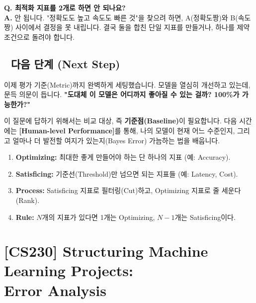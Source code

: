 \documentclass[11pt,a4paper]{book}
\theoremstyle{definition}
\begin{document}
\textbf{Q. 최적화 지표를 2개로 하면 안 되나요?} \\
\textbf{A.} 안 됩니다. "정확도도 높고 속도도 빠른 것"을 찾으려 하면, A(정확도짱)와 B(속도짱) 사이에서 결정을 못 내립니다. 결국 둘을 합친 단일 지표를 만들거나, 하나를 제약 조건으로 돌려야 합니다.

\section*{🔗 다음 단계 (Next Step)}
이제 평가 기준(Metric)까지 완벽하게 세팅했습니다. 모델을 열심히 개선하고 있는데, 문득 의문이 듭니다.
\textbf{"도대체 이 모델은 어디까지 좋아질 수 있는 걸까? 100\%가 가능한가?"}

이 질문에 답하기 위해서는 비교 대상, 즉 \textbf{기준점(Baseline)}이 필요합니다. 
다음 시간에는 \textbf{[Human-level Performance]}를 통해, 나의 모델이 현재 어느 수준인지, 그리고 얼마나 더 발전할 여지가 있는지(Bayes Error) 가늠하는 법을 배웁니다.

\vspace{0.5cm}

\begin{summarybox}[title={단원 요약 (Cheat Sheet)}]
\begin{enumerate}
    \item \textbf{Optimizing:} 최대한 좋게 만들어야 하는 단 하나의 지표 (예: Accuracy).
    \item \textbf{Satisficing:} 기준선(Threshold)만 넘으면 되는 지표들 (예: Latency, Cost).
    \item \textbf{Process:} Satisficing 지표로 필터링(Cut)하고, Optimizing 지표로 줄 세운다(Rank).
    \item \textbf{Rule:} $N$개의 지표가 있다면 1개는 Optimizing, $N-1$개는 Satisficing이다.
\end{enumerate}
\end{summarybox}


\chapter{[CS230] Structuring Machine Learning Projects: \\ Error Analysis}
\label{ch:lecture25}

\end{document}
